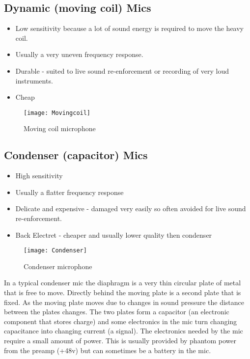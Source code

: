\subsection{Dynamic (moving coil) Mics}
\begin{itemize}
\item Low sensitivity because a lot of sound energy is required to move the heavy coil.
\item Usually a very uneven frequency response.
\item Durable - suited to live sound re-enforcement or recording of very loud instruments.
\item Cheap
\end{itemize}

\begin{figure}[H]
\centering
\texttt{[image: Movingcoil]}\caption{Moving coil microphone}
\label{fig:movingcoil}
\end{figure}

\subsection{Condenser (capacitor) Mics}
\begin{itemize}
\item High sensitivity
\item Usually a flatter frequency response
\item Delicate and expensive - damaged very easily so often avoided for live sound re-enforcement.
\item Back Electret - cheaper and usually lower quality then condenser
\end{itemize}


\begin{figure}[H]
\centering
\texttt{[image: Condenser]}\caption{Condenser microphone}
\label{fig:condenser}
\end{figure}

In a typical condenser mic the diaphragm is a very thin circular plate of metal that is free to move. Directly behind the moving plate is a second plate that is fixed. As the moving plate moves due to changes in sound pressure the distance between the plates changes. The two plates form a capacitor (an electronic component that stores charge) and some electronics in the mic turn changing capacitance into changing current (a signal). The electronics needed by the mic require a small amount of power. This is usually provided by phantom power from the preamp (+48v) but can sometimes be a battery in the mic.

